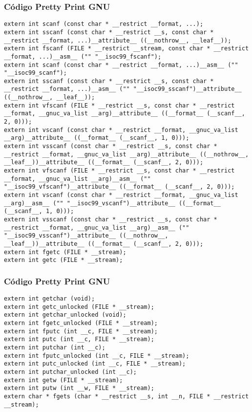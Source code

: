 \documentclass{beamer}
\begin{document}
\begin{frame}[fragile]
\frametitle{C\'odigo Pretty Print GNU}
\begin{verbatim}
extern int scanf (const char * __restrict __format, ...);
extern int sscanf (const char * __restrict __s, const char * __restrict __format, ...)__attribute__ ((__nothrow__, __leaf__));
extern int fscanf (FILE * __restrict __stream, const char * __restrict __format, ...)__asm__ ("" "__isoc99_fscanf");
extern int scanf (const char * __restrict __format, ...)__asm__ ("" "__isoc99_scanf");
extern int sscanf (const char * __restrict __s, const char * __restrict __format, ...)__asm__ ("" "__isoc99_sscanf")__attribute__ ((__nothrow__, __leaf__));
extern int vfscanf (FILE * __restrict __s, const char * __restrict __format, __gnuc_va_list __arg)__attribute__ ((__format__ (__scanf__, 2, 0)));
extern int vscanf (const char * __restrict __format, __gnuc_va_list __arg)__attribute__ ((__format__ (__scanf__, 1, 0)));
extern int vsscanf (const char * __restrict __s, const char * __restrict __format, __gnuc_va_list __arg)__attribute__ ((__nothrow__, __leaf__))__attribute__ ((__format__ (__scanf__, 2, 0)));
extern int vfscanf (FILE * __restrict __s, const char * __restrict __format, __gnuc_va_list __arg)__asm__ ("" "__isoc99_vfscanf")__attribute__ ((__format__ (__scanf__, 2, 0)));
extern int vscanf (const char * __restrict __format, __gnuc_va_list __arg)__asm__ ("" "__isoc99_vscanf")__attribute__ ((__format__ (__scanf__, 1, 0)));
extern int vsscanf (const char * __restrict __s, const char * __restrict __format, __gnuc_va_list __arg)__asm__ ("" "__isoc99_vsscanf")__attribute__ ((__nothrow__, __leaf__))__attribute__ ((__format__ (__scanf__, 2, 0)));
extern int fgetc (FILE * __stream);
extern int getc (FILE * __stream);
\end{verbatim}
\end{frame}
\begin{frame}[fragile]
\frametitle{C\'odigo Pretty Print GNU}
\begin{verbatim}
extern int getchar (void);
extern int getc_unlocked (FILE * __stream);
extern int getchar_unlocked (void);
extern int fgetc_unlocked (FILE * __stream);
extern int fputc (int __c, FILE * __stream);
extern int putc (int __c, FILE * __stream);
extern int putchar (int __c);
extern int fputc_unlocked (int __c, FILE * __stream);
extern int putc_unlocked (int __c, FILE * __stream);
extern int putchar_unlocked (int __c);
extern int getw (FILE * __stream);
extern int putw (int __w, FILE * __stream);
extern char * fgets (char * __restrict __s, int __n, FILE * __restrict __stream);
\end{verbatim}
\end{frame}
\end{document}
